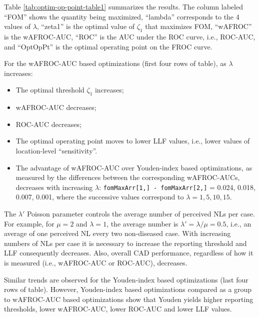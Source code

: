 \documentclass[
]{book}
\providecommand{\tightlist}{%
  \setlength{\itemsep}{0pt}\setlength{\parskip}{0pt}}
\begin{document}
Table \ref{tab:optim-op-point-table1} summarizes the results. The column labeled ``FOM'' shows the quantity being maximized, ``lambda'' corresponds to the 4 values of \(\lambda\), ``zeta1'' is the optimal value of \(\zeta_1\) that maximizes FOM, ``wAFROC'' is the wAFROC-AUC, ``ROC'' is the AUC under the ROC curve, i.e., ROC-AUC, and ``OptOpPt'' is the optimal operating point on the FROC curve.

For the wAFROC-AUC based optimizations (first four rows of table), as \(\lambda\) increases:

\begin{itemize}
\tightlist
\item
  The optimal threshold \(\zeta_1\) increases;
\item
  wAFROC-AUC decreases;
\item
  ROC-AUC decreases;
\item
  The optimal operating point moves to lower LLF values, i.e., lower values of location-level ``sensitivity''.
\item
  The advantage of wAFROC-AUC over Youden-index based optimizations, as measured by the differences between the corresponding wAFROC-AUCs, decreases with increasing \(\lambda\): \texttt{fomMaxArr{[}1,{]}\ -\ fomMaxArr{[}2,{]}} = 0.024, 0.018, 0.007, 0.001, where the successive values correspond to \(\lambda = 1, 5, 10, 15\).
\end{itemize}

The \(\lambda'\) Poisson parameter controls the average number of perceived NLs per case. For example, for \(\mu = 2\) and \(\lambda = 1\), the average number is \(\lambda' = \lambda /\mu = 0.5\), i.e., an average of one perceived NL every two non-diseased case. With increasing numbers of NLs per case it is necessary to increase the reporting threshold and LLF consequently decreases. Also, overall CAD performance, regardless of how it is measured (i.e., wAFROC-AUC or ROC-AUC), decreases.

Similar trends are observed for the Youden-index based optimizations (last four rows of table). However, Youden-index based optimizations compared as a group to wAFROC-AUC based optimizations show that Youden yields higher reporting thresholds, lower wAFROC-AUC, lower ROC-AUC and lower LLF values.
\end{document}
